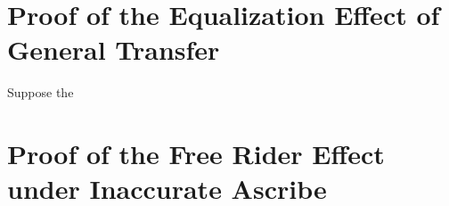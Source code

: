 
\section{Proof of the Equalization Effect of General Transfer}
Suppose the

\section{Proof of the Free Rider Effect under Inaccurate Ascribe}

